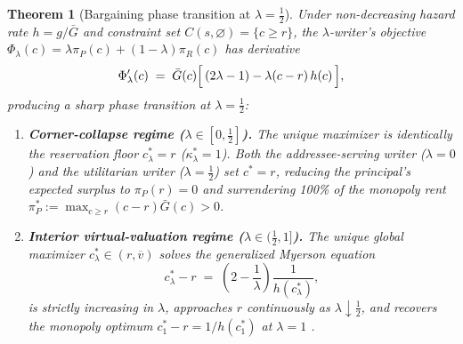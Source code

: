 \documentclass[10.5pt]{article}
\newtheorem{theorem}{Theorem}
\theoremstyle{definition}
\begin{document}
\begin{theorem}[Bargaining phase transition at $\lambda = \tfrac{1}{2}$]\label{thm:corner}
Under non-decreasing hazard rate $h = g/\bar{G}$ and constraint set $C(s, \varnothing) = \{c \ge r\}$, the $\lambda$-writer's objective $\Phi_\lambda(c) = \lambda \pi_P(c) + (1-\lambda)\pi_R(c)$ has derivative
\begin{equation}\label{eq:foc}
\Phi_\lambda'(c) \;=\; \bar{G}(c)\Bigl[\,(2\lambda - 1) - \lambda(c - r)\,h(c)\,\Bigr],
\end{equation}
producing a sharp phase transition at $\lambda = \tfrac{1}{2}$:
\begin{enumerate}[label=(\roman*),leftmargin=*,itemsep=2pt,topsep=2pt]
\item \textbf{Corner-collapse regime ($\lambda \in [0, \tfrac{1}{2}]$).} The unique maximizer is identically the reservation floor $c_\lambda^* = r$ ($\kappa_\lambda^* = 1$). Both the addressee-serving writer ($\lambda = 0$) and the utilitarian writer ($\lambda = \tfrac{1}{2}$) set $c^* = r$, reducing the principal's expected surplus to $\pi_P(r) = 0$ and surrendering 100\% of the monopoly rent $\pi_P^* := \max_{c \ge r}(c-r)\bar{G}(c) > 0$.
\item \textbf{Interior virtual-valuation regime ($\lambda \in (\tfrac{1}{2}, 1]$).} The unique global maximizer $c_\lambda^* \in (r, \overline v)$ solves the generalized Myerson equation
\begin{equation}\label{eq:myerson}
c_\lambda^* - r \;=\; \left(2 - \frac{1}{\lambda}\right)\frac{1}{h(c_\lambda^*)},
\end{equation}
is strictly increasing in $\lambda$, approaches $r$ continuously as $\lambda \downarrow \tfrac{1}{2}$, and recovers the monopoly optimum $c_1^* - r = 1/h(c_1^*)$ at $\lambda = 1$ \citep{myerson1981,riley1983}.
\end{enumerate}
\end{theorem}
\end{document}
